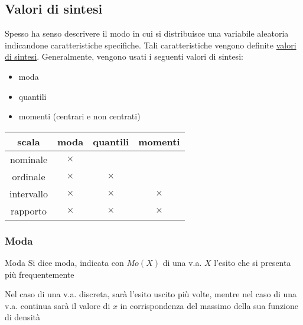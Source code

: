 \subsection{Valori di sintesi}
Spesso ha senso descrivere il modo in cui si distribuisce una variabile aleatoria indicandone caratteristiche specifiche. Tali caratteristiche vengono definite \underline{valori di sintesi}. Generalmente, vengono usati i seguenti valori di sintesi:
\begin{itemize}
	\item moda
	\item quantili
	\item momenti (centrari e non centrati)
\end{itemize}
\begin{table}[H]
	\centering
	\begin{tabular}{c c c c}
		\toprule
		scala      & moda        & quantili     & momenti     \\
		\midrule
		nominale   & $ \times $  &              &             \\
		ordinale   & $ \times $  & $ \times  $  &             \\
		intervallo & $ \times  $ & $ \times  $  & $ \times  $ \\
		rapporto   & $ \times  $ & $  \times  $ & $ \times  $ \\
		\bottomrule
	\end{tabular}
\end{table}
\subsubsection*{Moda}
\begin{definizione}{Moda}
	Si dice moda, indicata con $  Mo\left(X\right) $ di una v.a. $ X $ l'esito che si presenta più frequentemente
\end{definizione}
Nel caso di una v.a. discreta, sarà l'esito uscito più volte, mentre nel caso di una v.a. continua sarà il valore di $ x $ in corrispondenza del massimo della sua funzione di densità
